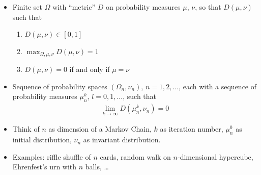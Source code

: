 \documentclass[12pt,t]{beamer}
\begin{document}
\begin{frame}
  \begin{itemize}
  \item Finite set $\Omega$ with ``metric'' $D$ on
    probability measures $\mu$, $\nu$, so that
    $D(\mu,\nu)$ such that 
    \begin{enumerate}
    \item $D(\mu,\nu)\in [0,1]$
    \item $\max_{\Omega,\mu,\nu} D(\mu,\nu) = 1$
    \item $D(\mu,\nu)=0$ if and only if $\mu=\nu$
    \end{enumerate}
  \item Sequence of probability spaces $(\Omega_n,\nu_n)$,
    $n=1,2,\ldots$, each with a sequence of probability measures
    $\mu^k_n$, $l=0,1,\ldots$, such that
    \begin{align*}
      \lim_{k \rightarrow \infty} D(\mu^k_n,\nu_n)=0
    \end{align*}
  \item Think of $n$ as dimension of a Markov Chain, $k$ as iteration
    number, $\mu^0_n$ as initial distribution, $\nu_n$ as invariant
    distribution.
  \item Examples: riffle shuffle of $n$ cards, random walk on
    $n$-dimensional hypercube, Ehrenfest's urn with $n$ balls, \ldots
  \end{itemize}
\end{frame}
\end{document}
